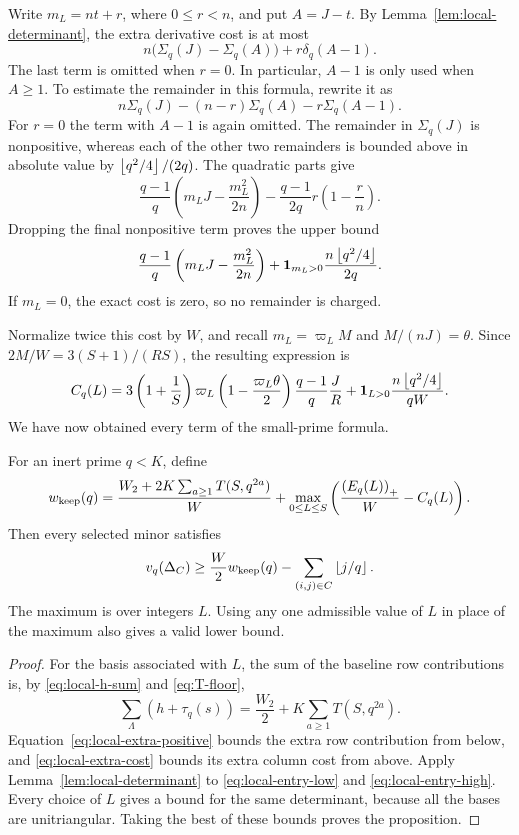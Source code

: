 Write $m_L=nt+r$, where $0\leq r<n$, and put $A=J-t$. By
Lemma~\ref{lem:local-determinant}, the extra derivative cost is at most
\[
 n\bigl(\Sigma_q(J)-\Sigma_q(A)\bigr)+r\delta_q(A-1).
\]
The last term is omitted when $r=0$. In particular, $A-1$ is only used
when $A\geq1$. To estimate the remainder in this formula, rewrite it as
\[
 n\Sigma_q(J)-(n-r)\Sigma_q(A)-r\Sigma_q(A-1).
\]
For $r=0$ the term with $A-1$ is again omitted. The remainder in $\Sigma_q(J)$
is nonpositive, whereas each of the other two remainders is bounded above
in absolute value by $\left\lfloor q^2/4\right\rfloor/(2q)$. The quadratic parts give
\[
 \frac{q-1}{q}\left(m_LJ-\frac{m_L^2}{2n}\right)
 -\frac{q-1}{2q}r\left(1-\frac rn\right).
\]
Dropping the final nonpositive term proves the upper bound
\begin{equation}\label{eq:local-extra-cost}
 \frac{q-1}{q}\left(m_LJ-\frac{m_L^2}{2n}\right)
 +\boldsymbol1_{m_L>0}\frac{n\left\lfloor q^2/4\right\rfloor}{2q}.
\end{equation}
If $m_L=0$, the exact cost is zero, so no remainder is charged.

Normalize twice this cost by $W$, and recall $m_L=\varpi_LM$ and
$M/(nJ)=\theta$. Since $2M/W=3(S+1)/(RS)$, the resulting expression is
\[
 C_q(L)=3\left(1+\frac1S\right)\varpi_L
       \left(1-\frac{\varpi_L\theta}{2}\right)\frac{q-1}{q}\frac JR
       +\boldsymbol1_{L>0}\frac{n\left\lfloor q^2/4\right\rfloor}{qW}.
\]
We have now obtained every term of the small-prime formula.

\begin{proposition}\label{prop:local-small-prime}
For an inert prime $q<K$, define
\begin{equation}\label{eq:wkeep}
 w_{\rm keep}(q)=
 \frac{W_2+2K\sum_{a\geq1}T(S,q^{2a})}{W}
 +\max_{0\leq L\leq S}
       \left(\frac{\left(E_q(L)\right)_+}W-C_q(L)\right).
\end{equation}
Then every selected minor satisfies
\[
 v_q(\Delta_C)\geq\frac W2w_{\rm keep}(q)
                       -\sum_{(i,j)\in C}\left\lfloor j/q\right\rfloor.
\]
The maximum is over integers $L$. Using any one admissible value of $L$
in place of the maximum also gives a valid lower bound.
\end{proposition}
\begin{proof}
For the basis associated with $L$, the sum of the baseline row contributions
is, by \eqref{eq:local-h-sum} and \eqref{eq:T-floor},
\[
 \sum_\Lambda(h+\tau_q(s))
 =\frac{W_2}{2}+K\sum_{a\geq1}T(S,q^{2a}).
\]
Equation~\eqref{eq:local-extra-positive} bounds the extra row contribution
from below, and \eqref{eq:local-extra-cost} bounds its extra column cost
from above. Apply Lemma~\ref{lem:local-determinant} to
\eqref{eq:local-entry-low} and \eqref{eq:local-entry-high}. Every choice
of $L$ gives a bound for the same determinant, because all the bases are
unitriangular. Taking the best of these bounds proves the proposition.
\end{proof}

